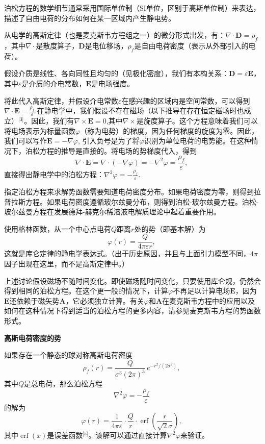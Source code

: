 泊松方程的数学细节通常采用国际单位制（SI单位，区别于高斯单位制）来表达，描述了自由电荷的分布如何在某一区域内产生静电势。

从电学的高斯定律（也是麦克斯韦方程组之一）的微分形式出发，有：\(\nabla \cdot \mathbf{D} = \rho_f\)，其中\(\nabla \cdot\)是散度算子，\(\mathbf{D}\)是电位移场，\(\rho_f\)是自由电荷密度（表示从外部引入的电荷）。

假设介质是线性、各向同性且均匀的（见极化密度），我们有本构关系：\(\mathbf{D} = \varepsilon \mathbf{E}\)，其中\(\varepsilon\)是介质的介电常数，\(\mathbf{E}\)是电场强度。

将此代入高斯定律，并假设介电常数\(\varepsilon\)在感兴趣的区域内是空间常数，可以得到\(\nabla \cdot \mathbf{E} = \frac{\rho_f}{\varepsilon}\).在静电学中，我们假设不存在磁场（以下推导在存在恒定磁场时也成立）\(^\text{[3]}\)。因此，我们有\(\nabla \times \mathbf{E} = 0\),其中\(\nabla \times\)是旋度算子。这个方程意味着我们可以将电场表示为标量函数\(\varphi\)（称为电势）的梯度，因为任何梯度的旋度为零。因此，我们可以写作\(\mathbf{E} = -\nabla \varphi\), 
引入负号是为了将\(\varphi\)识别为单位电荷的电势能。在这种情况下，泊松方程的推导是直接的。将电场的势梯度代入，得到
\[
\nabla \cdot \mathbf{E} = \nabla \cdot (-\nabla \varphi) = -\nabla^2 \varphi = \frac{\rho_f}{\varepsilon},~
\]
直接得出静电学中的泊松方程：\(\nabla^2 \varphi = -\frac{\rho_f}{\varepsilon}\).

指定泊松方程来求解势函数需要知道电荷密度分布。如果电荷密度为零，则得到拉普拉斯方程。如果电荷密度遵循玻尔兹曼分布，则得到泊松-玻尔兹曼方程。泊松-玻尔兹曼方程在发展德拜-赫克尔稀溶液电解质理论中起着重要作用。

使用格林函数，从一个中心点电荷\(Q\)距离\(r\)处的势（即基本解）为  
\[
\varphi(r) = \frac{Q}{4\pi \varepsilon r},~
\]  
这就是库仑定律的静电学表达式。（出于历史原因，并且与上面引力模型不同，\(4\pi\)因子出现在这里，而不是高斯定律中。）

上述讨论假设磁场不随时间变化。即使磁场随时间变化，只要使用库仑规，仍然会得到相同的泊松方程。在这个更一般的情况下，计算\(\varphi\)不再足以计算电场\(\mathbf{E}\)，因为\(\mathbf{E}\)还依赖于磁矢势\(\mathbf{A}\)，它必须独立计算。有关\(\varphi\)和\(\mathbf{A}\)在麦克斯韦方程中的应用以及如何在这种情况下得到适当的泊松方程的更多内容，请参见麦克斯韦方程的势函数形式。

\textbf{高斯电荷密度的势}

如果存在一个静态的球对称高斯电荷密度  
\[
\rho_f(r) = \frac{Q}{\sigma^3 (2\pi)^{3}}\, e^{-r^2 / (2\sigma^2)},~
\]  
其中\(Q\)是总电荷，那么泊松方程  
\[
\nabla^2 \varphi = -\frac{\rho_f}{\varepsilon}~
\]  
的解为  
\[
\varphi(r) = \frac{1}{4\pi \varepsilon} \cdot \frac{Q}{r} \cdot \operatorname{erf} \left( \frac{r}{\sqrt{2}\sigma} \right),~
\]  
其中\(\operatorname{erf}(x)\)是误差函数\(^\text{[5]}\)。该解可以通过直接计算\(\nabla^2 \varphi\)来验证。

